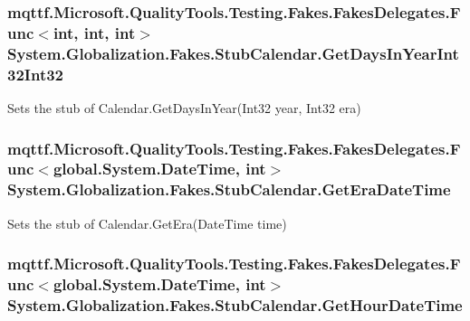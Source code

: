 \hypertarget{class_system_1_1_globalization_1_1_fakes_1_1_stub_calendar_a09aedb8672b60fe100036a95606b168c}{
\subsubsection[{Get\-Days\-In\-Year\-Int32\-Int32}]{\setlength{\rightskip}{0pt plus 5cm}mqttf.\-Microsoft.\-Quality\-Tools.\-Testing.\-Fakes.\-Fakes\-Delegates.\-Func$<$int, int, int$>$ System.\-Globalization.\-Fakes.\-Stub\-Calendar.\-Get\-Days\-In\-Year\-Int32\-Int32}}\label{class_system_1_1_globalization_1_1_fakes_1_1_stub_calendar_a09aedb8672b60fe100036a95606b168c}


Sets the stub of Calendar.\-Get\-Days\-In\-Year(\-Int32 year, Int32 era)

\hypertarget{class_system_1_1_globalization_1_1_fakes_1_1_stub_calendar_a5b036c8898865f9a1e831c2e9c6bb7f0}{
\subsubsection[{Get\-Era\-Date\-Time}]{\setlength{\rightskip}{0pt plus 5cm}mqttf.\-Microsoft.\-Quality\-Tools.\-Testing.\-Fakes.\-Fakes\-Delegates.\-Func$<$global.\-System.\-Date\-Time, int$>$ System.\-Globalization.\-Fakes.\-Stub\-Calendar.\-Get\-Era\-Date\-Time}}\label{class_system_1_1_globalization_1_1_fakes_1_1_stub_calendar_a5b036c8898865f9a1e831c2e9c6bb7f0}


Sets the stub of Calendar.\-Get\-Era(\-Date\-Time time)

\hypertarget{class_system_1_1_globalization_1_1_fakes_1_1_stub_calendar_ac09e93bd79236c706d482a0e7321f613}{
\subsubsection[{Get\-Hour\-Date\-Time}]{\setlength{\rightskip}{0pt plus 5cm}mqttf.\-Microsoft.\-Quality\-Tools.\-Testing.\-Fakes.\-Fakes\-Delegates.\-Func$<$global.\-System.\-Date\-Time, int$>$ System.\-Globalization.\-Fakes.\-Stub\-Calendar.\-Get\-Hour\-Date\-Time}}\label{class_system_1_1_globalization_1_1_fakes_1_1_stub_calendar_ac09e93bd79236c706d482a0e7321f613}


